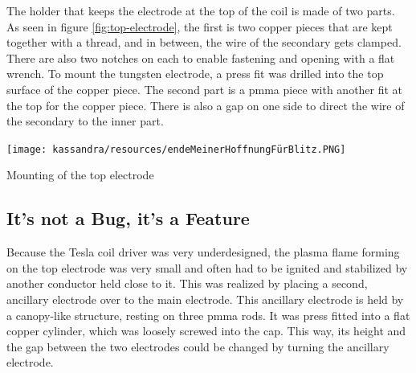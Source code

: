 The holder that keeps the electrode at the top of the coil is made of two parts. As seen in figure \ref{fig:top-electrode}, the first is two copper pieces that are kept together with a thread, and in between, the wire of the secondary gets clamped. There are also two notches on each to enable fastening and opening with a flat wrench. To mount the tungsten electrode, a press fit was drilled into the top surface of the copper piece. The second part is a \gls{pmma} piece with another fit at the top for the copper piece. There is also a gap on one side to direct the wire of the secondary to the inner part. 

\begin{marginfigure}[-8cm]
    \centering
    \texttt{[image: kassandra/resources/endeMeinerHoffnungFürBlitz.PNG]}
    \caption{Mounting of the top electrode}
    \label{fig:top-electrode}
\end{marginfigure}

\subsection{It's not a Bug, it's a Feature}

Because the Tesla coil driver was very underdesigned, the plasma flame forming on the top electrode was very small and often had to be ignited and stabilized by another conductor held close to it. This was realized by placing a second, ancillary electrode over to the main electrode. This ancillary electrode is held by a canopy-like structure, resting on three \gls{pmma} rods. It was press fitted into a flat copper cylinder, which was loosely screwed into the cap. This way, its height and the gap between the two electrodes could be changed by turning the ancillary electrode. 


